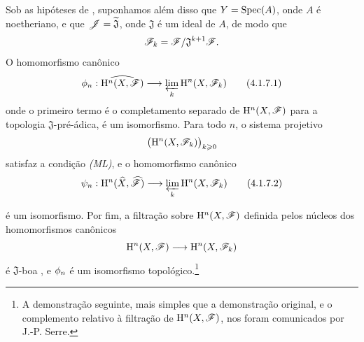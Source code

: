 \begin{corollary}[4.1.7]
\label{III.4.1.7}
Sob as hipóteses de , suponhamos além disso que
$Y=\operatorname{Spec}(A)$, onde $A$ é noetheriano, e que
$\mathscr{J}=\widetilde{\mathfrak{J}}$, onde $\mathfrak{J}$ é um ideal
de $A$, de modo que
\[
  \mathscr{F}_k=\mathscr{F}/\mathfrak{J}^{k+1}\mathscr{F}.
\]
O homomorfismo canônico
\[
  \vphi_n:
  \widehat{\HH^n(X,\sh{F})}
  \longrightarrow
  \varprojlim_k\HH^n(X,\sh{F}_k)
  \tag{4.1.7.1}
  \label{III.4.1.7.1}
\]
onde o primeiro termo é o completamento separado de
$\mathrm{H}^n(X,\mathscr{F})$ para a topologia $\mathfrak{J}$-pré-ádica, é um
isomorfismo.
Para todo $n$, o sistema projetivo
\[
  \bigl(\mathrm{H}^n(X,\mathscr{F}_k)\bigr)_{k\geqslant0}
\]
satisfaz a condição \emph{(ML)}, e o homomorfismo canônico
\[
  \psi_n:
  \HH^n(\widehat{X},\widehat{\sh{F}})
  \longrightarrow
  \varprojlim_k\HH^n(X,\sh{F}_k)
  \tag{4.1.7.2}
  \label{III.4.1.7.2}
\]


é um isomorfismo.
Por fim, a filtração sobre $\mathrm{H}^n(X,\mathscr{F})$ definida pelos
núcleos dos homomorfismos canônicos
\[
  \mathrm{H}^n(X,\mathscr{F})\longrightarrow\mathrm{H}^n(X,\mathscr{F}_k)
\]
é $\mathfrak{J}$-boa , e $\phi_n$ é um
isomorfismo topológico.\footnote{A demonstração seguinte, mais simples
que a demonstração original, e o complemento relativo à filtração
de $\mathrm{H}^n(X,\mathscr{F})$, nos foram comunicados por J.-P. Serre.}
\end{corollary}

